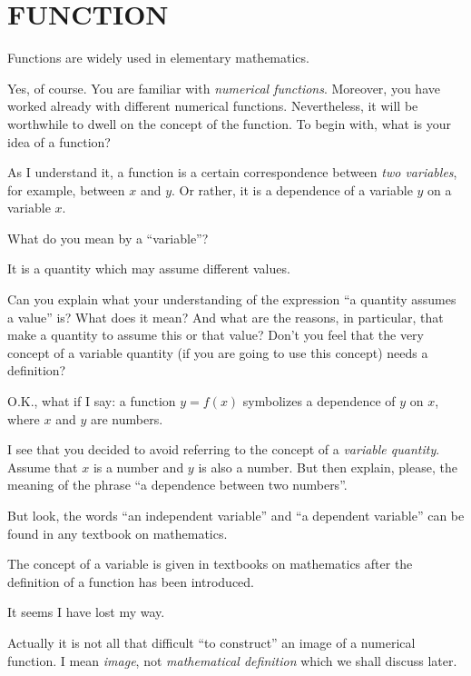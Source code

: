 
\chapter{FUNCTION}
\label{function}
{\parindent=0pt

\rdr Functions are widely used in elementary mathematics.

\athr Yes, of course. You are familiar with \emph{numerical functions}. Moreover, you have worked already with different numerical functions. Nevertheless, it will be worthwhile to dwell on the concept of the function. To begin with, what is your idea of a function?

\rdr As I understand it, a function is a certain correspondence between \emph{two variables}, for example, between $x$ and $y$. Or rather, it is a dependence of a variable $y$ on a variable $x$.

\athr What do you mean by a ``variable''?

\rdr It is a quantity which may assume different values.

\athr Can you explain what your understanding of the expression ``a quantity assumes a value'' is? What does it mean? And what are the reasons, in particular, that make a quantity to assume this or that value? Don't you feel that the very concept of a variable quantity (if you are going to use this concept) needs a definition?

\rdr O.K., what if I say: a function $y = f (x)$ symbolizes a dependence of $y$ on $x$, where $x$ and $y$ are numbers.

\athr I see that you decided to avoid referring to the concept of a \emph{variable quantity}. Assume that $x$ is a number and $y$ is also a number. But then explain, please, the meaning of the phrase ``a dependence between two numbers''.

\rdr But look, the words ``an independent variable'' and ``a dependent variable'' can be found in any textbook on mathematics.

\athr The concept of a variable is given in textbooks on mathematics after the definition of a function has been introduced.

\rdr It seems I have lost my way.

\athr Actually it is not all that difficult ``to construct'' an image of a numerical function. I mean \emph{image}, not \emph{mathematical definition} which we shall discuss later.

}

